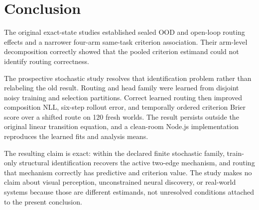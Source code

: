 \section{Conclusion}
\label{sec:conclusion}

The original exact-state studies established sealed OOD and open-loop routing
effects and a narrower four-arm same-task criterion association.  Their
arm-level decomposition correctly showed that the pooled criterion estimand
could not identify routing correctness.

The prospective stochastic study resolves that identification problem rather
than relabeling the old result.  Routing and head family were learned from
disjoint noisy training and selection partitions.  Correct learned routing
then improved composition NLL, six-step rollout error, and temporally ordered
criterion Brier score over a shifted route on 120 fresh worlds.  The result
persists outside the original linear transition equation, and a clean-room
Node.js implementation reproduces the learned fits and analysis means.

The resulting claim is exact: within the declared finite stochastic family,
train-only structural identification recovers the active two-edge mechanism,
and routing that mechanism correctly has predictive and criterion value.  The
study makes no claim about visual perception, unconstrained neural discovery,
or real-world systems because those are different estimands, not unresolved
conditions attached to the present conclusion.
